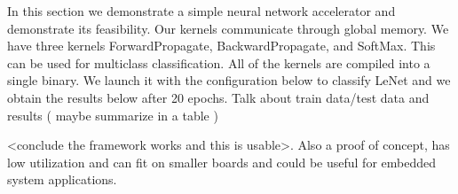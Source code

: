 In this section we demonstrate a simple neural network accelerator and demonstrate its feasibility. Our kernels communicate through global memory. We have three kernels ForwardPropagate, BackwardPropagate, and SoftMax. This can be used for multiclass classification. All of the kernels are compiled into a single binary. We launch it with the configuration below to classify LeNet and we obtain the results below after 20 epochs. Talk about train data/test data and results ( maybe summarize in a table ) 

<conclude the framework works and this is usable>. Also a proof of concept, has low utilization and can fit on smaller boards and could be useful for embedded system applications. 



